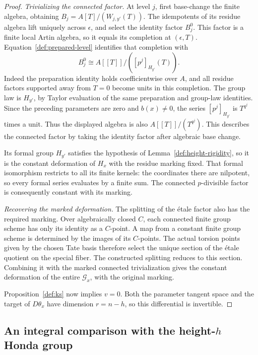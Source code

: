 \begin{proof}
\smallskip
\noindent\emph{Trivializing the connected factor.}
At level $j$, first base-change the finite algebra, obtaining
$B_j=A[T]/(W_{j,y'}(T))$.  The idempotents of its residue algebra lift
uniquely across $\epsilon$, and select the identity factor $B_j^0$.
This factor is a finite local Artin algebra, so it equals its completion
at $(\epsilon,T)$.  Equation~\eqref{def:prepared-level} identifies that
completion with
\[
 B_j^0\cong A[[T]]/([p^j]_{H_{y'}}(T)).
\]
Indeed the preparation identity holds coefficientwise over $A$, and all
residue factors supported away from $T=0$ become units in this
completion.  The group law is $H_{y'}$, by Taylor evaluation of the same
preparation and group-law identities.  Since the preceding parameters
are zero and $b(x)\ne0$, the series $[p^j]_{H_{y'}}$ is $T^{q^j}$ times
a unit.  Thus the displayed algebra is also $A[[T]]/(T^{q^j})$.
This describes the connected factor by taking the identity factor after
algebraic base change.

Its formal group $H_{y'}$ satisfies the hypothesis of
Lemma~\ref{def:height-rigidity}, so it is the constant deformation of
$H_x$ with the residue marking fixed.  That formal isomorphism restricts
to all its finite kernels: the coordinates there are nilpotent, so every
formal series evaluates by a finite sum.  The connected $p$-divisible
factor is consequently constant with its marking.

\smallskip
\noindent\emph{Recovering the marked deformation.}
The splitting of the \'etale factor also has the required marking.
Over algebraically closed $C$, each connected finite group scheme has
only its identity as a $C$-point.  A map from a constant finite group
scheme is determined by the images of its $C$-points.  The actual
torsion points given by the chosen Tate basis therefore select the unique section of the
\'etale quotient on the special fiber.  The constructed splitting
reduces to this section.  Combining it with the marked connected
trivialization gives the constant deformation of the entire
$\mathcal G_x$, with the original marking.

Proposition~\ref{def:ks} now implies $v=0$.  Both the parameter tangent
space and the target of $D\theta_x$ have dimension $r=n-h$, so this
differential is invertible.
\end{proof}

\subsection{An integral comparison with the height-\texorpdfstring{$h$}{h} Honda group}

